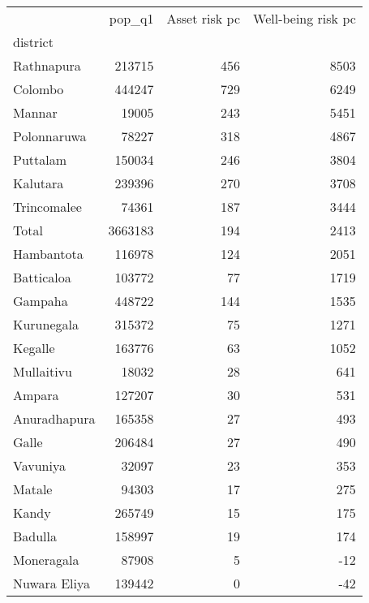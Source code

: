 \begin{tabular}{lrrr}
\toprule
{} &   pop\_q1 &  Asset risk pc &  Well-being risk pc \\
district     &          &                &                     \\
\midrule
Rathnapura   &   213715 &            456 &                8503 \\
Colombo      &   444247 &            729 &                6249 \\
Mannar       &    19005 &            243 &                5451 \\
Polonnaruwa  &    78227 &            318 &                4867 \\
Puttalam     &   150034 &            246 &                3804 \\
Kalutara     &   239396 &            270 &                3708 \\
Trincomalee  &    74361 &            187 &                3444 \\
Total        &  3663183 &            194 &                2413 \\
Hambantota   &   116978 &            124 &                2051 \\
Batticaloa   &   103772 &             77 &                1719 \\
Gampaha      &   448722 &            144 &                1535 \\
Kurunegala   &   315372 &             75 &                1271 \\
Kegalle      &   163776 &             63 &                1052 \\
Mullaitivu   &    18032 &             28 &                 641 \\
Ampara       &   127207 &             30 &                 531 \\
Anuradhapura &   165358 &             27 &                 493 \\
Galle        &   206484 &             27 &                 490 \\
Vavuniya     &    32097 &             23 &                 353 \\
Matale       &    94303 &             17 &                 275 \\
Kandy        &   265749 &             15 &                 175 \\
Badulla      &   158997 &             19 &                 174 \\
Moneragala   &    87908 &              5 &                 -12 \\
Nuwara Eliya &   139442 &              0 &                 -42 \\
\bottomrule
\end{tabular}
